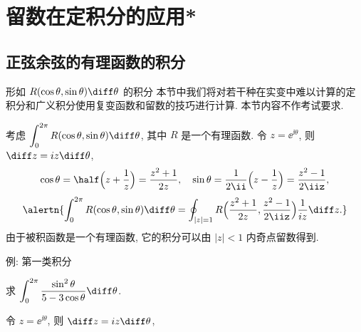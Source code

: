 \section{留数在定积分的应用*}

\subsection{正弦余弦的有理函数的积分}

\begin{frame}{形如 $R(\cos\theta,\sin\theta)\diff\theta$ 的积分\noexer}
	\onslide<+->
	本节中我们将对若干种在实变中难以计算的定积分和广义积分使用复变函数和留数的技巧进行计算.
	\onslide<+->
	本节内容不作考试要求.

	\onslide<+->
	考虑 $\displaystyle\int_0^{2\pi} R(\cos\theta,\sin\theta)\diff\theta$, 其中 $R$ 是一个有理函数.
	\onslide<+->
	令 $z=\ee^{\ii\theta}$, 则 $\diff z=iz\diff\theta$,
	\onslide<+->
	\[\cos\theta=\half\Bigl(z+\frac1z\Bigr)=\frac{z^2+1}{2z},\quad
	\sin\theta=\frac1{2\ii}\Bigl(z-\frac1z\Bigr)=\frac{z^2-1}{2\iiz},
	\]
	\onslide<+->
	\[\alertn{\int_0^{2\pi} R(\cos\theta,\sin\theta)\diff\theta=\oint_{|z|=1}R\Bigl(\frac{z^2+1}{2z},\frac{z^2-1}{2\iiz}\Bigr)\frac1{iz}\diff z.}
	\]
	\onslide<+->
	由于被积函数是一个有理函数, 它的积分可以由 $|z|<1$ 内奇点留数得到.
\end{frame}


\begin{frame}{例: 第一类积分\noexer}\small
	\beqskip{1pt}
	\onslide<+->
	\begin{example}
		求 $\displaystyle\int_0^{2\pi}\frac{\sin^2\theta}{5-3\cos\theta}\diff\theta$.
	\end{example}

	\onslide<+->
	\begin{solution}
		令 $z=\ee^{\ii\theta}$, 则 $\diff z=iz\diff\theta$,
		\onslide<+->{
			\[\cos\theta=\half\Bigl(z+\frac1z\Bigr)=\frac{z^2+1}{2z},\qquad
			\sin\theta=\frac1{2\ii}\Bigl(z-\frac1z\Bigr)=\frac{z^2-1}{2\iiz},
	\]
		}\onslide<+->{
			\[
				\int_0^{2\pi}\frac{\sin^2\theta}{5-3\cos\theta}\diff\theta
				=\oint_{|z|=1}\frac{(z^2-1)^2}{-4z^2}\cdot\frac1{5-3\dfrac{z^2+1}{2z}}\cdot\frac{\diff z}{iz}
				=-\frac i6\oint_{|z|=1}\frac{(z^2-1)^2}{z^2(z-3)(z-\dfrac13)}\diff z.
	\]
		}\onslide<+->{%
			则
			$\Res[f(z),0]=\dfrac{10}3, \Res[f(z),\dfrac13]=-\dfrac83$,
		}
		\onslide<+->{
			\[
				\int_0^{2\pi}\frac{\sin^2\theta}{5-3\cos\theta}\diff\theta
				=-\frac i6\cdot 2\pi\ii\Bigl[\Res[f(z),0]+\Res[f(z),\frac13]\Bigr]
				=\frac{2\pi}9.
	\]
		}
		\vspace{-.5\baselineskip}
	\end{solution}
	\endgroup
\end{frame}

